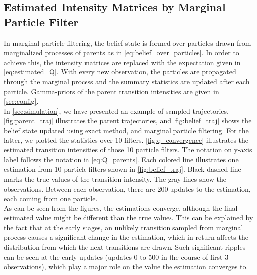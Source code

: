 \subsection{Estimated Intensity Matrices by Marginal Particle Filter}
In marginal particle filtering, the belief state is formed over particles drawn from marginalized processes of parents as in \autoref{eq:belief_over_particles}. In order to achieve this, the intensity matrices are replaced with the expectation given in \autoref{eq:estimated_Q}. With every new observation, the particles are propagated through the marginal process and the summary statistics are updated after each particle. Gamma-priors of the parent transition intensities are given in \cref{sec:config}. \\
In \cref{sec:simulation}, we have presented an example of sampled trajectories. \autoref{fig:parent_traj} illustrates the parent trajectories, and \autoref{fig:belief_traj} shows the belief state updated using exact method, and marginal particle filtering. For the latter, we plotted the statistics over 10 filters. \autoref{fig:q_convergence} illustrates the estimated transition intensities of those 10 particle filters. The notation on y-axis label follows the notation in \autoref{eq:Q_parents}. Each colored line illustrates one estimation from 10 particle filters shown in \autoref{fig:belief_traj}. Black dashed line marks the true values of the transition intensity. The gray lines show the observations. Between each observation, there are 200 updates to the estimation, each coming from one particle. \\
As can be seen from the figures, the estimations converge, although the final estimated value might be different than the true values. This can be explained by the fact that at the early stages, an unlikely transition sampled from marginal process causes a significant change in the estimation, which in return affects the distribution from which the next transitions are drawn. Such significant ripples can be seen at the early updates (updates 0 to 500 in the course of first 3 observations), which play a major role on the value the estimation converges to.
